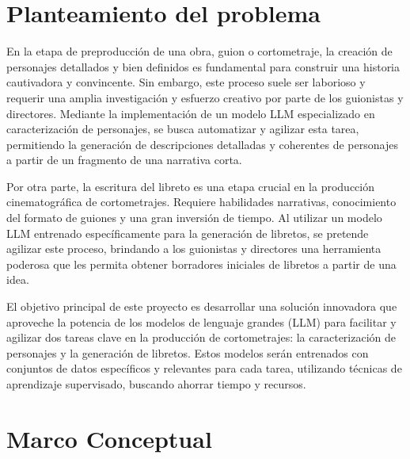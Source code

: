 \documentclass[journal,onecolumn]{IEEEtran}
\begin{document}
	
	
	
	
	\section{Planteamiento del problema}
	
	
	En la etapa de preproducción de una obra, guion o cortometraje, la creación de personajes detallados y bien definidos es fundamental para construir una historia cautivadora y convincente. Sin embargo, este proceso suele ser laborioso y requerir una amplia investigación y esfuerzo creativo por parte de los guionistas y directores. Mediante la implementación de un modelo LLM especializado en caracterización de personajes, se busca automatizar y agilizar esta tarea, permitiendo la generación de descripciones detalladas y coherentes de personajes a partir de un fragmento de una narrativa corta.
	
	Por otra parte, la escritura del libreto es una etapa crucial en la producción cinematográfica de cortometrajes. Requiere habilidades narrativas, conocimiento del formato de guiones y una gran inversión de tiempo. Al utilizar un modelo LLM entrenado específicamente para la generación de libretos, se pretende agilizar este proceso, brindando a los guionistas y directores una herramienta poderosa que les permita obtener borradores iniciales de libretos a partir de una idea.
	
	El objetivo principal de este proyecto es desarrollar una solución innovadora que aproveche la potencia de los modelos de lenguaje grandes (LLM) para facilitar y agilizar dos tareas clave en la producción de cortometrajes: la caracterización de personajes y la generación de libretos. Estos modelos serán entrenados con conjuntos de datos específicos y relevantes para cada tarea, utilizando técnicas de aprendizaje supervisado, buscando ahorrar tiempo y recursos.
	\section{Marco Conceptual}
\end{document}
